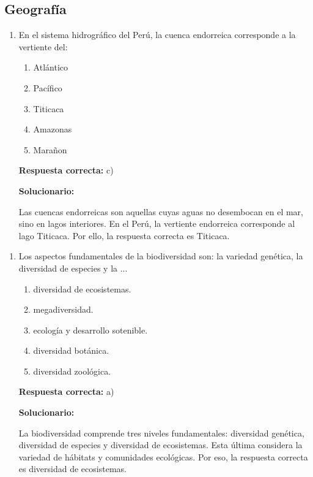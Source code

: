 \subsection*{Geografía}

\begin{enumerate}[resume]
	
	\item En el sistema hidrográfico del Perú, la cuenca endorreica corresponde a la vertiente del:
	
	
	\begin{enumerate}[label=\alph*)]
		\item Atlántico
		\item Pacífico
		\item Titicaca
		\item Amazonas
		\item Marañon
	\end{enumerate}
	
	\textbf{Respuesta correcta:} c)
	
	\vspace{2mm}
	\textbf{Solucionario:}
	
	Las cuencas endorreicas son aquellas cuyas aguas no desembocan en el mar, sino en lagos interiores. En el Perú, la vertiente endorreica corresponde al lago Titicaca. Por ello, la respuesta correcta es Titicaca.
	
\end{enumerate}

\begin{enumerate}[resume]
	
	\item Los aspectos fundamentales de la biodiversidad son: la variedad genética, la diversidad de especies y la ...
	
	\begin{enumerate}[label=\alph*)]
		\item diversidad de ecosistemas.
		\item megadiversidad.
		\item ecología y desarrollo sotenible.
		\item diversidad botánica.
		\item diversidad zoológica.
	\end{enumerate}
	
	\textbf{Respuesta correcta:} a)
	
	\vspace{2mm}
	\textbf{Solucionario:}
	
	La biodiversidad comprende tres niveles fundamentales: diversidad genética, diversidad de especies y diversidad de ecosistemas. Esta última considera la variedad de hábitats y comunidades ecológicas. Por eso, la respuesta correcta es diversidad de ecosistemas.
	
\end{enumerate}



